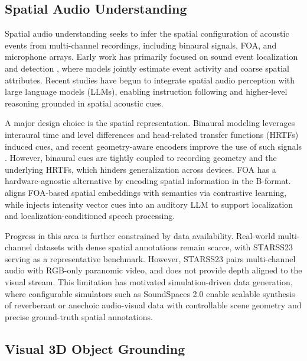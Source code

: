\subsection{Spatial Audio Understanding}

Spatial audio understanding seeks to infer the spatial configuration of acoustic events from multi-channel recordings, including binaural signals, FOA, and microphone arrays. Early work has primarily focused on sound event localization and detection \citep{adavanne2018sound, cao2021improved, shimada2021accdoa, shimada2022multi}, where models jointly estimate event activity and coarse spatial attributes. Recent studies have begun to integrate spatial audio perception with large language models (LLMs), enabling instruction following and higher-level reasoning grounded in spatial acoustic cues.

A major design choice is the spatial representation. 
Binaural modeling leverages interaural time and level differences and head-related transfer functions (HRTFs) induced cues, and recent geometry-aware encoders improve the use of such signals \citep{zheng2024bat, biswas2025owl}. 
However, binaural cues are tightly coupled to recording geometry and the underlying HRTFs, which hinders generalization across devices. 
FOA has a hardware-agnostic alternative by encoding spatial information in the B-format. 
\citep{devnani2024learning} aligns FOA-based spatial embeddings with semantics via contrastive learning, while \citep{tang2024can} injects intensity vector cues into an auditory LLM to support localization and localization-conditioned speech processing.

Progress in this area is further constrained by data availability. 
Real-world multi-channel datasets with dense spatial annotations remain scarce, with STARSS23 \citep{shimada2023starss23} serving as a representative benchmark. 
However, STARSS23 pairs multi-channel audio with RGB-only paranomic video, and does not provide depth aligned to the visual stream. 
This limitation has motivated simulation-driven data generation, where configurable simulators such as SoundSpaces 2.0 \citep{chen22soundspaces2} enable scalable synthesis of reverberant or anechoic audio-visual data with controllable scene geometry and precise ground-truth spatial annotations.

\subsection{Visual 3D Object Grounding}

